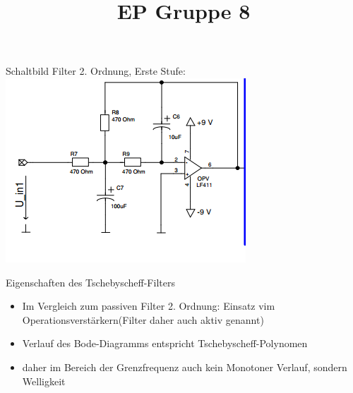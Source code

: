 \documentclass[compress,11pt]{beamer}
\title{EP Gruppe 8}
\begin{document}
\begin{frame}

Schaltbild Filter 2. Ordnung, Erste Stufe:\\
\includegraphics[width=.7\textwidth]{schalt/schalt_41}

\end{frame}

\begin{frame}
\begin{block}{Eigenschaften des Tschebyscheff-Filters}
\begin{itemize}
\item Im Vergleich zum passiven Filter 2. Ordnung: Einsatz vim Operationsverstärkern(Filter daher auch aktiv genannt)
\item Verlauf des Bode-Diagramms entspricht Tschebyscheff-Polynomen
\item daher im Bereich der Grenzfrequenz auch kein Monotoner Verlauf, sondern Welligkeit
\end{itemize}

\end{block}
\end{frame}
\end{document}
